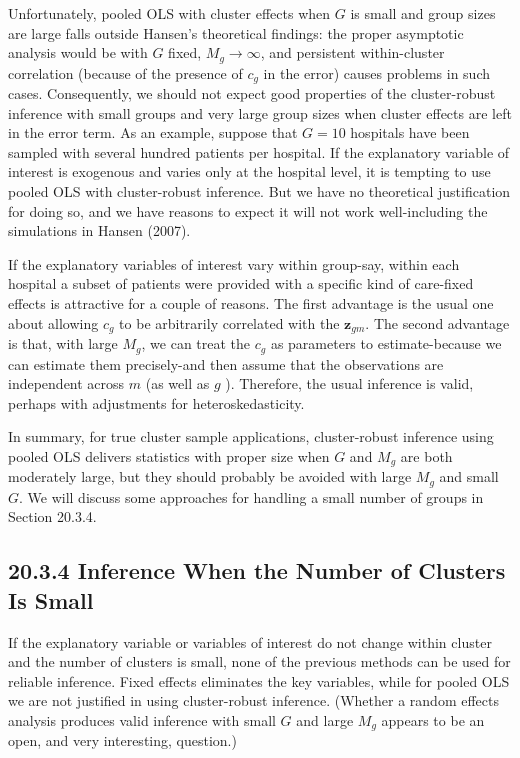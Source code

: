 \documentclass[10pt]{article}
\begin{document}
Unfortunately, pooled OLS with cluster effects when $G$ is small and group sizes are large falls outside Hansen's theoretical findings: the proper asymptotic analysis would be with $G$ fixed, $M_{g} \rightarrow \infty$, and persistent within-cluster correlation (because of the presence of $c_{g}$ in the error) causes problems in such cases. Consequently, we should not expect good properties of the cluster-robust inference with small groups and very large group sizes when cluster effects are left in the error term. As an example, suppose that $G=10$ hospitals have been sampled with several hundred patients per hospital. If the explanatory variable of interest is exogenous and varies only at the hospital level, it is tempting to use pooled OLS with cluster-robust inference. But we have no theoretical justification for doing so, and we have reasons to expect it will not work well-including the simulations in Hansen (2007).

If the explanatory variables of interest vary within group-say, within each hospital a subset of patients were provided with a specific kind of care-fixed effects is attractive for a couple of reasons. The first advantage is the usual one about allowing $c_{g}$ to be arbitrarily correlated with the $\mathbf{z}_{g m}$. The second advantage is that, with large $M_{g}$, we can treat the $c_{g}$ as parameters to estimate-because we can estimate them precisely-and then assume that the observations are independent across $m$ (as well as $g$ ). Therefore, the usual inference is valid, perhaps with adjustments for heteroskedasticity.

In summary, for true cluster sample applications, cluster-robust inference using pooled OLS delivers statistics with proper size when $G$ and $M_{g}$ are both moderately large, but they should probably be avoided with large $M_{g}$ and small $G$. We will discuss some approaches for handling a small number of groups in Section 20.3.4.

\subsection*{20.3.4 Inference When the Number of Clusters Is Small}
If the explanatory variable or variables of interest do not change within cluster and the number of clusters is small, none of the previous methods can be used for reliable inference. Fixed effects eliminates the key variables, while for pooled OLS we are not justified in using cluster-robust inference. (Whether a random effects analysis produces valid inference with small $G$ and large $M_{g}$ appears to be an open, and very interesting, question.)
\end{document}
